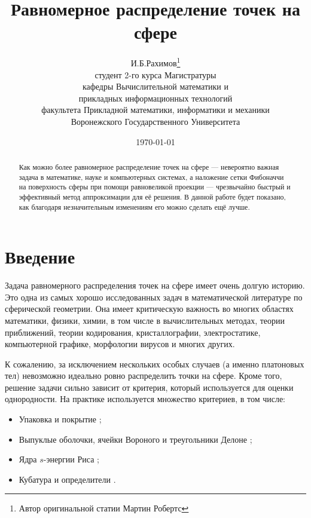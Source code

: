 \documentclass[12pt, a4paper]{article}
\title
{
	Равномерное распределение точек на сфере
}
\author
{
	И.Б.Рахимов\thanks{Автор оригинальной статии Мартин Робертс} \\
	студент 2-го курса Магистратуры  \\
	кафедры Вычислительной математики и \\
	прикладных информационных технологий \\
	факультета Прикладной математики, информатики и механики \\
	Воронежского Государственного Университета
}
\date
{
	\today
}
\begin{document}
\maketitle
\thispagestyle{empty} %

\newpage

\begin{abstract}
Как можно более равномерное распределение точек на сфере — невероятно важная задача в математике, науке и компьютерных системах, а наложение сетки Фибоначчи на поверхность сферы при помощи равновеликой проекции — чрезвычайно быстрый и эффективный метод аппроксимации для её решения. В данной работе будет показано, как благодаря незначительным изменениям его можно сделать ещё лучше.
\end{abstract}

\newpage

\tableofcontents


\newpage

\section*{Введение}

Задача равномерного распределения точек на сфере имеет очень долгую историю. Это одна из самых хорошо исследованных задач в математической литературе по сферической геометрии. Она имеет критическую важность во многих областях математики, физики, химии, в том числе в вычислительных методах, теории приближений, теории кодирования, кристаллографии, электростатике, компьютерной графике, морфологии вирусов и многих других.

К сожалению, за исключением нескольких особых случаев (а именно платоновых тел) невозможно идеально ровно распределить точки на сфере. Кроме того, решение задачи сильно зависит от критерия, который используется для оценки однородности. На практике используется множество критериев, в том числе:

\begin{itemize}
	\item Упаковка и покрытие \cite{alaxandrow_2009};
	\item Выпуклые оболочки, ячейки Вороного и треугольники Делоне \cite{alaxandrow_2009, berg_2016};
	\item Ядра $s$-энергии Риса \cite{alaxandrow_2009, berg_2016, demidovich_2019};
	\item Кубатура и определители \cite{alaxandrow_2009, demidovich_2019}.
\end{itemize}
\end{document}
